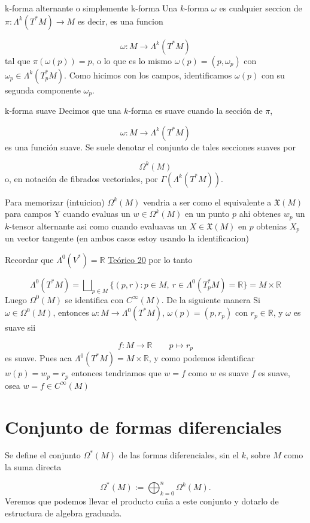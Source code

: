 \begin{bookdefinition}{k-forma alternante o simplemente k-forma}
Una $k$-forma $\omega$ es cualquier seccion de $\pi:\Lambda^k(T^*M)\to M$ es decir, es una funcion

\[
\omega:M\to\Lambda^k(T^*M)
\]
tal que $\pi(\omega(p))=p$, o lo que es lo mismo $\omega(p)=(p,\omega_p)$ con $\omega_p\in\Lambda^k(T_p^*M)$. Como hicimos con los campos, identificamos $\omega(p)$ con su segunda componente $\omega_p$.

\end{bookdefinition}
\begin{bookdefinition}{k-forma suave}
Decimos que una $k$-forma es suave cuando la sección de $\pi$,

\[
\omega:M\to\Lambda^k(T^*M)
\]
es una función suave. Se suele denotar el conjunto de tales secciones suaves por

\[
\Omega^k(M)
\]
o, en notación de fibrados vectoriales, por $\Gamma(\Lambda^k(T^*M))$.

\end{bookdefinition}
\begin{bookremark}{Para memorizar (intuicion)}
$\Omega^{k}(M)$ vendria a ser como el equivalente a $\mathfrak{X}(M)$ para campos Y cuando evaluas un $w\in \Omega^{k}(M)$ en un punto $p$ ahi obtenes $w_{p}$ un $k$-tensor alternante asi como cuando evaluavas un $X\in \mathfrak{X}(M)$ en $p$ obtenias $X_{p}$ un vector tangente (en ambos casos estoy usando la identificacion)

\end{bookremark}
\begin{bookremark}{}
Recordar que $\Lambda^0(V^*)=\mathbb R$ \hyperref[blk:2c0c65]{Teórico 20} por lo tanto

\[
\Lambda^0(T^*M)=\mathbb \bigsqcup_{p\in M}\{ (p,r):p\in M,\ r\in \Lambda^{0}(T_{p}^{*} M)=\mathbb{R}  \}=M\times \mathbb{R}
\]
Luego $\Omega^0(M)$ se identifica con $C^\infty(M)$. De la siguiente manera Si $\omega\in\Omega^0(M)$, entonces $\omega:M\to\Lambda^0(T^*M)$, $\omega(p)=(p,r_{p})$ con $r_{p}\in\mathbb R$, y $\omega$ es suave sii

\[
f:M\to\mathbb R \qquad p\mapsto r_{p}
\]
es suave. Pues aca $\Lambda^0(T^*M)=M\times\mathbb R$, y como podemos identificar $w(p)=w_{p}=r_{p}$ entonces tendriamos que $w=f$ como $w$ es suave $f$ es suave, osea $w=f\in C^{\infty}(M)$

\end{bookremark}
\section{Conjunto de formas diferenciales}
\begin{bookremark}{}
Se define el conjunto $\Omega^*(M)$ de las formas diferenciales, sin el $k$, sobre $M$ como la suma directa

\[
\Omega^*(M):=\bigoplus_{k=0}^n\Omega^k(M).
\]
Veremos que podemos llevar el producto cuña a este conjunto y dotarlo de estructura de algebra graduada.

\end{bookremark}
